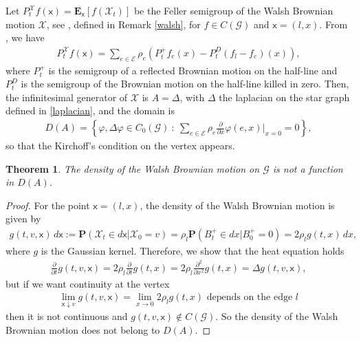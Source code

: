 \documentclass[11pt,a4paper]{article}
\theoremstyle{plain}
\newtheorem{theorem}{Theorem}[section]
\theoremstyle{definition}
\theoremstyle{remark}
\begin{document}
		Let $P_t^{\mathcal{X}} f(\mathsf{x})= \mathbf{E}_{\mathsf{x}}[f(\mathcal{X}_t)]$ be the Feller semigroup of the Walsh Brownian motion $\mathcal{X}$, see \cite[Theorem 2.1]{yor-walsh}, defined in Remark \ref{walsh}, for $f \in C(\mathcal{G})$ and $\mathsf{x}=(l, x)$. From \cite[Formula (2.1) and (2.2)]{yor-walsh}, we have
		\begin{align*}
			\displaystyle
			P_t^\mathcal{X} f(\mathsf{x})= \sum_{e\in \mathcal{E}} \rho_e \left(P_t^+ f_e(x) - P_t^D(f_l  - f_e)(x)\right),
		\end{align*}
		where $P^+_t$ is the semigroup of a reflected Brownian motion on the half-line and $P_t^D$ is the semigroup of the Brownian motion on the half-line killed in zero. Then, the infinitesimal generator of $\mathcal{X}$ is $A=\Delta$, with $\Delta$ the laplacian on the star graph defined in \eqref{laplacian}, and the domain is
		\begin{align}
			\label{domain-walsh}
			D(A)=\left\{\varphi, \Delta \varphi \in C_0(\mathcal{G}) \ : \ \sum_{e \in \mathcal{E}} \rho_e \frac{\partial}{\partial x} \varphi(e,x)\big\vert_{x=0}=0\right\},
		\end{align}
		so that the Kirchoff's condition on the vertex appears.
		\begin{theorem}
			The density of the Walsh Brownian motion on $\mathcal{G}$ is not a function in $D(A)$.
		\end{theorem}
		\begin{proof}
			For the point $\mathsf{x}=(l,x)$, the density of the Walsh Brownian motion is given by
			\begin{align*}
				g(t,v, \mathsf{x})\, d\mathsf{x} :=\mathbf{P}(\mathcal{X}_t \in d\mathsf{x} \vert \mathcal{X}_0=v)= \rho_l \mathbf{P}(B^+_t \in dx \vert B^+_0=0)= 2 \rho_l g(t,x)\, dx,
			\end{align*}
			where $g$ is the Gaussian kernel. Therefore, we show that the heat equation holds
			\begin{align*}
				\frac{\partial}{\partial t} g(t,v, \mathsf{x})= 2 \rho_l \frac{\partial}{\partial t} g(t,x) = 2 \rho_l \frac{\partial^2}{\partial x^2} g(t,x)= \Delta g(t,v, \mathsf{x}),
			\end{align*}
			but if we want continuity at the vertex
			\begin{align}
				\label{lim_vertex}
				\lim_{\mathsf{x}\downarrow v} g(t, v, \mathsf{x})=\lim_{x \to 0}  2 \rho_l g(t,x) \text{ depends on the edge $l$} 
			\end{align}
			then it is not continuous and $g(t,v, \mathsf{x}) \notin C(\mathcal{G})$. So the density of the Walsh Brownian motion does not belong to $D(A)$.
		\end{proof}
		
\end{document}
